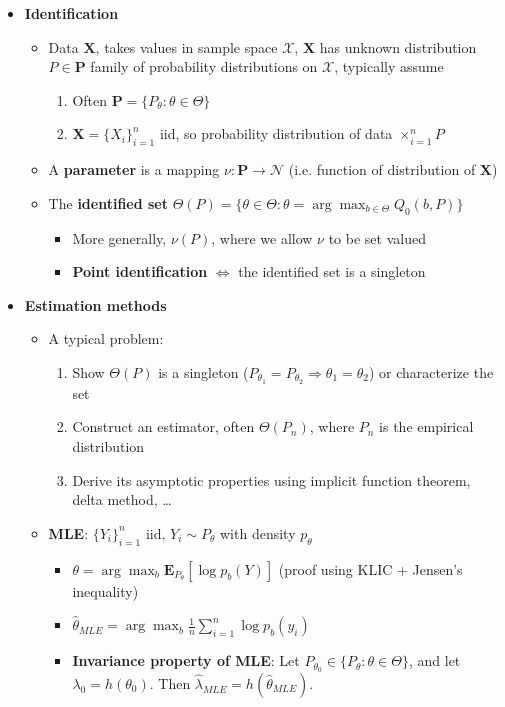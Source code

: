 \documentclass[12pt,english]{article}
\begin{document}
\begin{itemize}
	\item \textbf{Identification}
	\begin{itemize}
		\item Data $\textbf{X}$, takes values in sample space $\mathcal{X}$, $\textbf{X}$ has unknown distribution $P \in \textbf{P}$ family of probability distributions on $\mathcal{X}$, typically assume
		\begin{enumerate}
			\item Often $\textbf{P} = \{ P_{\theta} : \theta \in \Theta \}$
			\item $\textbf{X} = \{ X_{i} \}_{i=1}^{n}$ iid, so probability distribution of data $\times_{i=1}^{n} P$
		\end{enumerate}
		\item A \textbf{parameter} is a mapping $\nu : \mathbf{P} \to \mathcal{N}$ (i.e. function of distribution of $\textbf{X}$)
		\item The \textbf{identified set} $\displaystyle\Theta(P) = \{ \theta \in \Theta : \theta = \arg \max_{b \in \Theta} Q_{0}(b, P) \}$
		\begin{itemize}
			\item More generally, $\nu(P)$, where we allow $\nu$ to be set valued
			\item \textbf{Point identification} $\Leftrightarrow$ the identified set is a singleton
		\end{itemize}
	\end{itemize}
	\item \textbf{Estimation methods}
	\begin{itemize}
		\item A typical problem:
		\begin{enumerate}
			\item Show $\Theta(P)$ is a singleton ($P_{\theta_{1}} = P_{\theta_{2}} \Rightarrow \theta_{1} = \theta_{2}$) or characterize the set
			\item Construct an estimator, often $\Theta(P_{n})$, where $P_{n}$ is the empirical distribution
			\item Derive its asymptotic properties using implicit function theorem, delta method, \ldots
		\end{enumerate}
		\item \textbf{MLE}: $\{ Y_{i} \}_{i=1}^{n}$ iid, $Y_{i} \sim P_{\theta}$ with density $p_{\theta}$
		\begin{itemize}
			\item $\theta = \arg \max_{b} \mathbf{E}_{P_{\theta}} [\log p_{b}(Y)]$ (proof using KLIC + Jensen's inequality)
			\item $\widehat{\theta}_{MLE} = \arg \max_{b} \frac{1}{n} \sum_{i=1}^{n} \log p_{b}(y_{i})$
			\item \textbf{Invariance property of MLE}: Let $P_{\theta_{0}} \in \{ P_{\theta} : \theta \in \Theta \}$, and let $\lambda_{0} = h(\theta_{0})$. Then $\widehat{\lambda}_{MLE} = h(\widehat{\theta}_{MLE})$.
		\end{itemize}
	\end{itemize}
\end{itemize}
\end{document}
